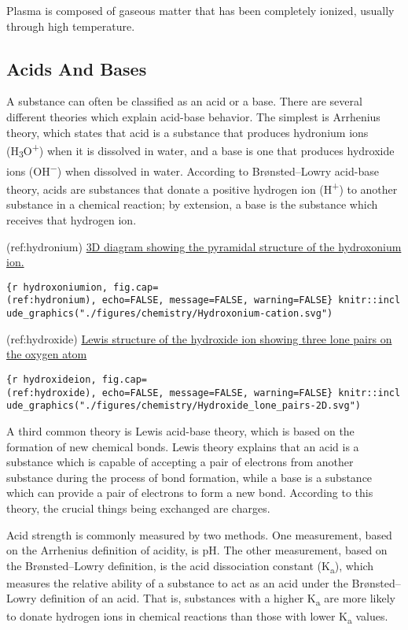 \documentclass[
]{article}
\begin{document}
Plasma is composed of gaseous matter that has been completely ionized,
usually through high temperature.

\hypertarget{acids-and-bases}{%
\subsection{Acids And Bases}\label{acids-and-bases}}

A substance can often be classified as an acid or a base. There are
several different theories which explain acid-base behavior. The
simplest is Arrhenius theory, which states that acid is a substance that
produces hydronium ions (H\textsubscript{3}O\textsuperscript{+}) when it
is dissolved in water, and a base is one that produces hydroxide ions
(OH\textsuperscript{−}) when dissolved in water. According to
Brønsted--Lowry acid-base theory, acids are substances that donate a
positive hydrogen ion (H\textsuperscript{+}) to another substance in a
chemical reaction; by extension, a base is the substance which receives
that hydrogen ion.

(ref:hydronium)
\href{https://commons.wikimedia.org/wiki/File:Hydroxonium-cation.svg}{3D
diagram showing the pyramidal structure of the hydroxonium ion.}

\texttt{\{r\ hydroxoniumion,\ fig.cap=\textquotesingle{}(ref:hydronium)\textquotesingle{},\ echo=FALSE,\ message=FALSE,\ warning=FALSE\}\ knitr::include\_graphics("./figures/chemistry/Hydroxonium-cation.svg")}

(ref:hydroxide)
\href{https://commons.wikimedia.org/wiki/File:Hydroxide_lone_pairs-2D.svg}{Lewis
structure of the hydroxide ion showing three lone pairs on the oxygen
atom}

\texttt{\{r\ hydroxideion,\ fig.cap=\textquotesingle{}(ref:hydroxide)\textquotesingle{},\ echo=FALSE,\ message=FALSE,\ warning=FALSE\}\ knitr::include\_graphics("./figures/chemistry/Hydroxide\_lone\_pairs-2D.svg")}

A third common theory is Lewis acid-base theory, which is based on the
formation of new chemical bonds. Lewis theory explains that an acid is a
substance which is capable of accepting a pair of electrons from another
substance during the process of bond formation, while a base is a
substance which can provide a pair of electrons to form a new bond.
According to this theory, the crucial things being exchanged are
charges.

Acid strength is commonly measured by two methods. One measurement,
based on the Arrhenius definition of acidity, is pH. The other
measurement, based on the Brønsted--Lowry definition, is the acid
dissociation constant (K\textsubscript{a}), which measures the relative
ability of a substance to act as an acid under the Brønsted--Lowry
definition of an acid. That is, substances with a higher
K\textsubscript{a} are more likely to donate hydrogen ions in chemical
reactions than those with lower K\textsubscript{a} values.
\end{document}
